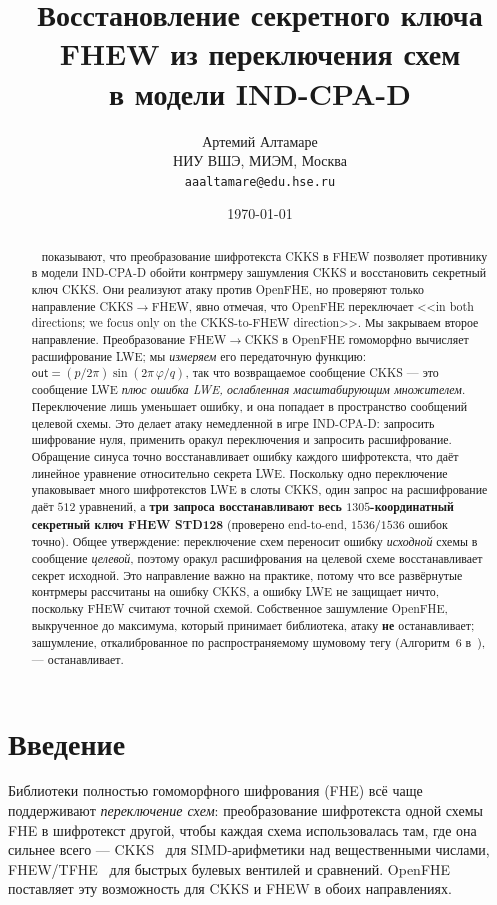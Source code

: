 \documentclass[11pt]{article}
\title{\bfseries Восстановление секретного ключа FHEW из переключения схем\\ \fto{} в модели IND-CPA-D}
\author{%
  Артемий Алтамаре\\[2pt]
  \small НИУ ВШЭ, МИЭМ, Москва\\
  \small \texttt{aaaltamare@edu.hse.ru}%
}
\date{\today}
\newcommand{\fto}{\texorpdfstring{FHEW$\to$CKKS}{FHEW-to-CKKS}}
\newcommand{\ctf}{\texorpdfstring{CKKS$\to$FHEW}{CKKS-to-FHEW}}
\newcommand{\out}{\mathsf{out}}
\begin{document}
\maketitle

\begin{abstract}
\citeauthor{santato2026}~\cite{santato2026} показывают, что преобразование шифротекста CKKS в
FHEW позволяет противнику в модели IND-CPA-D обойти контрмеру зашумления CKKS и восстановить
секретный ключ CKKS. Они реализуют атаку против OpenFHE, но проверяют только направление \ctf{},
явно отмечая, что OpenFHE переключает <<in both directions; we focus only on the
CKKS-to-FHEW direction>>. Мы закрываем второе направление. Преобразование \fto{} в OpenFHE
гомоморфно вычисляет расшифрование LWE; мы \emph{измеряем} его передаточную функцию:
$\out = (p/2\pi)\sin(2\pi\,\varphi/q)$, так что возвращаемое сообщение CKKS --- это сообщение LWE
\emph{плюс ошибка LWE, ослабленная масштабирующим множителем}. Переключение лишь уменьшает ошибку, и она попадает в пространство сообщений целевой схемы. Это делает
атаку немедленной в игре IND-CPA-D: запросить шифрование нуля, применить оракул переключения и
запросить расшифрование. Обращение синуса точно восстанавливает ошибку каждого шифротекста, что
даёт линейное уравнение относительно секрета LWE. Поскольку одно переключение упаковывает много
шифротекстов LWE в слоты CKKS, один запрос на расшифрование даёт $512$ уравнений, а
\textbf{три запроса восстанавливают весь $1305$-координатный секретный ключ FHEW STD128} (проверено
end-to-end, $1536/1536$ ошибок точно). Общее утверждение: переключение схем переносит ошибку
\emph{исходной} схемы в сообщение \emph{целевой}, поэтому оракул расшифрования на целевой схеме
восстанавливает секрет исходной. Это направление важно на практике, потому что все развёрнутые
контрмеры рассчитаны на ошибку CKKS, а ошибку LWE не защищает ничто, поскольку FHEW считают
точной схемой. Собственное зашумление OpenFHE, выкрученное
до максимума, который принимает библиотека, атаку \textbf{не} останавливает; зашумление,
откалиброванное по распространяемому шумовому тегу (Алгоритм~6 в~\cite{santato2026}), ---
останавливает.
\end{abstract}

\section{Введение}

Библиотеки полностью гомоморфного шифрования (FHE) всё чаще поддерживают \emph{переключение схем}:
преобразование шифротекста одной схемы FHE в шифротекст другой, чтобы каждая схема использовалась
там, где она сильнее всего --- CKKS~\cite{cheon2017} для SIMD-арифметики над вещественными числами,
FHEW/TFHE~\cite{ducas2015} для быстрых булевых вентилей и сравнений. OpenFHE~\cite{openfhe}
поставляет эту возможность для CKKS и FHEW в обоих направлениях.
\end{document}
